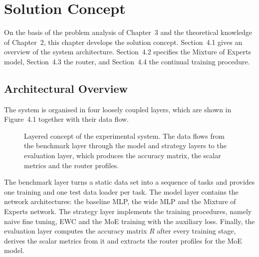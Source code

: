 \chapter{Solution Concept}
\label{chap:concept}

On the basis of the problem analysis of Chapter~3 and the theoretical
knowledge of Chapter~2, this chapter develops the solution concept.
Section~4.1 gives an overview of the system architecture. Section~4.2
specifies the Mixture of Experts model, Section~4.3 the router, and
Section~4.4 the continual training procedure.

\section{Architectural Overview}
\label{sec:overview}

The system is organised in four loosely coupled layers, which are shown in
Figure~4.1 together with their data flow.

\begin{figure}[H]
\centering
{}
\caption{Layered concept of the experimental system. The data flows from
the benchmark layer through the model and strategy layers to the evaluation
layer, which produces the accuracy matrix, the scalar metrics and the
router profiles.}
\label{fig:system}
\end{figure}

The benchmark layer turns a static data set into a sequence of tasks and
provides one training and one test data loader per task. The model layer
contains the network architectures: the baseline MLP, the wide MLP and the
Mixture of Experts network. The strategy layer implements the training
procedures, namely naive fine tuning, EWC and the MoE training with the
auxiliary loss. Finally, the evaluation layer computes the accuracy matrix
$R$ after every training stage, derives the scalar metrics from it and
extracts the router profiles for the MoE model.

